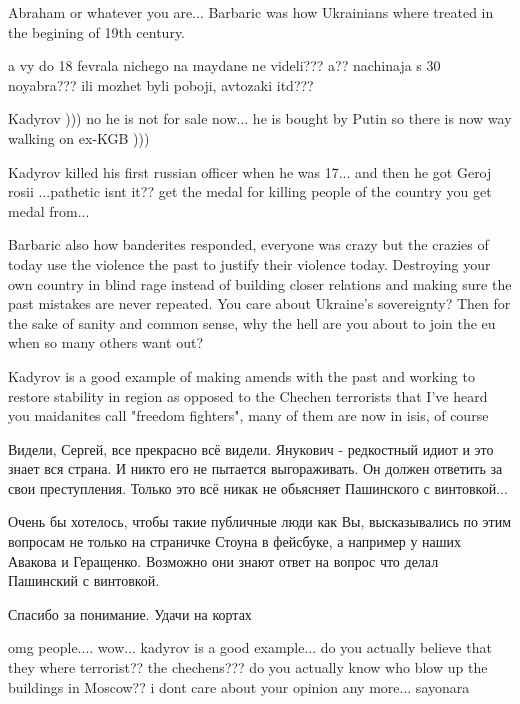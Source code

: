 \begin{itemize}
\begin{itemize}
Abraham or whatever you are... Barbaric was how Ukrainians where treated in the
begining of 19th century.


a vy do 18 fevrala nichego na maydane ne videli??? a?? nachinaja s 30
noyabra??? ili mozhet byli poboji, avtozaki itd???


Kadyrov ))) no he is not for sale now... he is bought by Putin so there is now
way walking on ex-KGB )))


Kadyrov killed his first russian officer when he was 17... and then he got Geroj
rosii ...pathetic isnt it?? get the medal for killing people of the country you
get medal from...


Barbaric also how banderites responded, everyone was crazy but the crazies of
today use the violence the past to justify their violence today. Destroying
your own country in blind rage instead of building closer relations and making
sure the past mistakes are never repeated. You care about Ukraine's
sovereignty? Then for the sake of sanity and common sense, why the hell are you
about to join the eu when so many others want out?


Kadyrov is a good example of making amends with the past and working to restore
stability in region as opposed to the Chechen terrorists that I've heard you
maidanites call "freedom fighters", many of them are now in isis, of course


Видели, Сергей, все прекрасно всё видели. Янукович - редкостный идиот и это
знает вся страна. И никто его не пытается выгораживать. Он должен ответить за
свои преступления. Только это всё никак не обьясняет Пашинского с винтовкой...

Очень бы хотелось, чтобы такие публичные люди как Вы, высказывались по этим
вопросам не только на страничке Стоуна в фейсбуке, а например у наших Авакова и
Геращенко. Возможно они знают ответ на вопрос что делал Пашинский с винтовкой.

Спасибо за понимание. Удачи на кортах


omg people.... wow... kadyrov is a good example... do you actually believe that
they where terrorist?? the chechens??? do you actually know who blow up the
buildings in Moscow?? i dont care about your opinion any more... sayonara


\end{itemize}
\end{itemize}
